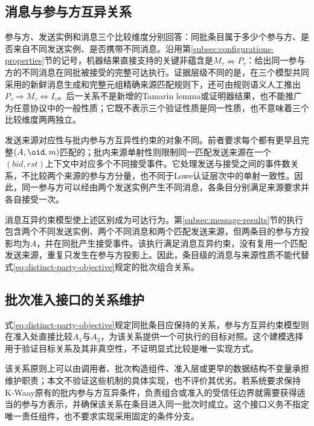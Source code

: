 \subsection{消息与参与方互异关系}
\label{subsec:relation-discussion}

参与方、发送实例和消息三个比较维度分别回答：同批条目属于多少个参与方、是否来自不同发送实例、是否携带不同消息。沿用第\ref{subsec:configurations-properties}节的记号，机器结果直接支持的关键非蕴含是$M_\tau\nRightarrow P_\tau$：给出同一参与方的不同消息在同批被接受的完整可达执行。证据层级不同的是，在三个模型共同采用的新鲜消息生成和完整元组精确来源匹配规则下，还可由规则语义人工推出$P_\tau\Rightarrow M_\tau\Leftrightarrow I_\tau$。后一关系不是新增的Tamarin lemma或证明器结果，也不能推广为任意协议中的一般性质；它既不表示三个验证性质是同一性质，也不意味着三个比较维度两两独立。

发送来源对应性与批内参与方互异性约束的对象不同。前者要求每个\receiveraccept 都有更早且完整$(A,\oid,m)$匹配的\sendaction；批内来源单射性则限制同一匹配发送来源在一个$(\mathit{bid},\mathit{rst})$上下文中对应多个不同接受事件。它处理发送与接受之间的事件数关系，不比较两个来源的参与方分量，也不同于Lowe认证层次中的单射一致性。因此，同一参与方可以经由两个发送实例产生不同消息，各条目分别满足来源要求并各自接受一次。

消息互异约束模型使上述区别成为可达行为。第\ref{subsec:message-results}节的执行包含两个不同发送实例、两个不同消息和两个匹配发送来源，但两条目的参与方投影均为$A$，并在同批产生接受事件。该执行满足消息互异约束，没有复用一个匹配发送来源，重复只发生在参与方投影上。因此，条目级的消息与来源性质不能代替式\eqref{eq:distinct-party-objective}规定的批次组合关系。

\subsection{批次准入接口的关系维护}
\label{subsec:interface-maintenance}

式\eqref{eq:distinct-party-objective}规定同批条目应保持的关系，参与方互异约束模型则在准入处直接比较$A_1$与$A_2$，为该关系提供一个可执行的目标对照。这个建模选择用于验证目标关系及其非真空性，不证明显式比较是唯一实现方式。

该关系原则上可以由调用者、批次构造组件、准入层或更早的数据结构不变量承担维护职责；本文不验证这些机制的具体实现，也不评价其优劣。若系统要求保持K-Waay原有的批内参与方互异条件，负责组合或准入的受信任边界就需要获得适当的参与方表示，并确保该关系在条目进入同一批次时成立。这个接口义务不指定唯一责任组件，也不要求实现采用固定的条件分支。

